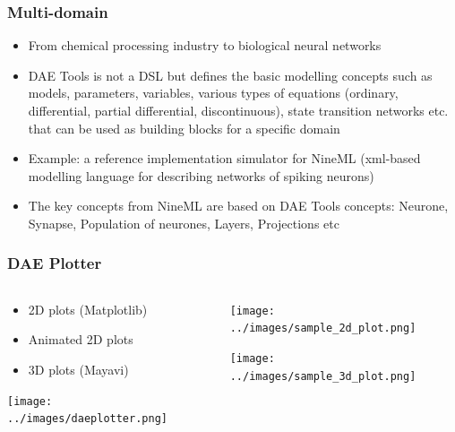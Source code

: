 \documentclass{beamer}
\begin{document}
\begin{frame}
\frametitle{Multi-domain}
\begin{block}{}
\begin{itemize}
  \item From chemical processing industry to biological neural networks
  \item DAE Tools is not a DSL but defines the basic modelling concepts such as models, parameters, variables, various types of equations 
        (ordinary, differential, partial differential, discontinuous), state transition networks etc. that can be used as building blocks 
        for a specific domain
  \item Example: a reference implementation simulator for NineML (xml-based modelling language for describing networks of spiking neurons)
  \item The key concepts from NineML are based on DAE Tools concepts: Neurone, Synapse, Population of neurones, Layers, Projections etc
\end{itemize}
\end{block}
\end{frame}

\begin{frame}
\frametitle{DAE Plotter}
\begin{columns}
  \begin{column}{0.5\paperwidth}
    \begin{center}
      \begin{itemize}
	\item 2D plots (Matplotlib)
	\item Animated 2D plots
	\item 3D plots (Mayavi)
      \end{itemize}
    \end{center}
    \begin{center}
      \texttt{[image: ../images/daeplotter.png]}
    \end{center}
  \end{column}
  \begin{column}{0.5\paperwidth}
    \begin{center}
      \texttt{[image: ../images/sample\_2d\_plot.png]}
    \end{center}
    \begin{center}
      \texttt{[image: ../images/sample\_3d\_plot.png]}
    \end{center}
  \end{column}
\end{columns}
\end{frame}
\end{document}
